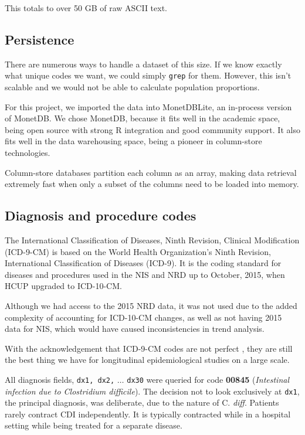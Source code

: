\documentclass[12pt]{ociamthesis}\usepackage[]{graphicx}\usepackage[]{color}
\newcommand{\cdiff}{C. \textit{diff}}
\begin{document}
This totals to over 50 GB of raw ASCII text. 

\subsection{Persistence}

There are numerous ways to handle a dataset of this size. If we know exactly what unique codes we want,
we could simply \texttt{grep} for them. However, this isn't scalable and we would not be able to calculate
population proportions.

For this project, we imported the data into MonetDBLite, an in-process version of MonetDB. 
We chose MonetDB, because it fits well in the academic space, being open source with strong R 
integration and good community support.
It also fits well in the data warehousing space, being a pioneer in column-store technologies. 

Column-store databases partition each column as an array, making data retrieval extremely fast when
only a subset of the columns need to be loaded into memory. \cite{MonetDB}

\subsection{Diagnosis and procedure codes}

The International Classification of Diseases, Ninth Revision, Clinical Modification (ICD-9-CM) is based on the World Health Organization's Ninth Revision,
International Classification of Diseases (ICD-9). It is the coding standard for diseases and procedures used in the NIS and NRD up to October, 2015, when
HCUP upgraded to ICD-10-CM. 

Although we had access to the 2015 NRD data, it was not used due to the added complexity of accounting for ICD-10-CM changes, as well as not having 2015
data for NIS, which would have caused inconsistencies in trend analysis. 

With the acknowledgement that ICD-9-CM codes are not perfect \cite{Uchiyama2015}, they are still the best thing we have for longitudinal 
epidemiological studies on a large scale. 

All diagnosis fields, \texttt{dx1, dx2,} $\hdots$ \texttt{dx30} were queried for code \textbf{00845} (\textit{Intestinal infection due to Clostridium difficile}). 
The decision not to look exclusively at \texttt{dx1}, the principal diagnosis, was deliberate, due to the nature of \cdiff. Patients rarely contract CDI
independently. It is typically contracted while in a hospital setting while being treated for a separate disease. 
\end{document}

